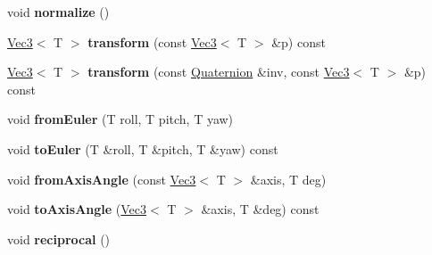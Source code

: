 \begin{DoxyCompactItemize}
\item 
\hypertarget{classps_1_1base_1_1Quaternion_a51217afbeff443006bd1291e5226f4e8}{}void {\bfseries normalize} ()\label{classps_1_1base_1_1Quaternion_a51217afbeff443006bd1291e5226f4e8}

\item 
\hypertarget{classps_1_1base_1_1Quaternion_aa759dd2cd36b30566ee6f878c6ce7c09}{}\hyperlink{classps_1_1base_1_1Vec3}{Vec3}$<$ T $>$ {\bfseries transform} (const \hyperlink{classps_1_1base_1_1Vec3}{Vec3}$<$ T $>$ \&p) const \label{classps_1_1base_1_1Quaternion_aa759dd2cd36b30566ee6f878c6ce7c09}

\item 
\hypertarget{classps_1_1base_1_1Quaternion_a9b8056b4245be689156a606d24b4eac0}{}\hyperlink{classps_1_1base_1_1Vec3}{Vec3}$<$ T $>$ {\bfseries transform} (const \hyperlink{classps_1_1base_1_1Quaternion}{Quaternion} \&inv, const \hyperlink{classps_1_1base_1_1Vec3}{Vec3}$<$ T $>$ \&p) const \label{classps_1_1base_1_1Quaternion_a9b8056b4245be689156a606d24b4eac0}

\item 
\hypertarget{classps_1_1base_1_1Quaternion_a2ec237cabe8b49da342c1b52a30d8a6e}{}void {\bfseries from\+Euler} (T roll, T pitch, T yaw)\label{classps_1_1base_1_1Quaternion_a2ec237cabe8b49da342c1b52a30d8a6e}

\item 
\hypertarget{classps_1_1base_1_1Quaternion_a127d109fa1b5433de6329238066342ff}{}void {\bfseries to\+Euler} (T \&roll, T \&pitch, T \&yaw) const \label{classps_1_1base_1_1Quaternion_a127d109fa1b5433de6329238066342ff}

\item 
\hypertarget{classps_1_1base_1_1Quaternion_a38158d647aed26fbc4d7fe1d09046929}{}void {\bfseries from\+Axis\+Angle} (const \hyperlink{classps_1_1base_1_1Vec3}{Vec3}$<$ T $>$ \&axis, T deg)\label{classps_1_1base_1_1Quaternion_a38158d647aed26fbc4d7fe1d09046929}

\item 
\hypertarget{classps_1_1base_1_1Quaternion_a38ec26ebb3e6fb4673e815b1207a1e7c}{}void {\bfseries to\+Axis\+Angle} (\hyperlink{classps_1_1base_1_1Vec3}{Vec3}$<$ T $>$ \&axis, T \&deg) const \label{classps_1_1base_1_1Quaternion_a38ec26ebb3e6fb4673e815b1207a1e7c}

\item 
\hypertarget{classps_1_1base_1_1Quaternion_a97b93db5da574263f122f5fbbc16b7e6}{}void {\bfseries reciprocal} ()\label{classps_1_1base_1_1Quaternion_a97b93db5da574263f122f5fbbc16b7e6}


\end{DoxyCompactItemize}
